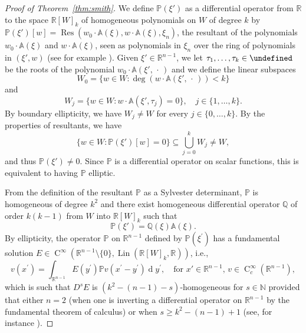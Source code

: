 \documentclass[a4paper,10pt]{amsart}
\let\C\undefined
\newcommand{\R}{\mathbb R}
\newcommand{\N}{\mathbb N}
\newcommand{\Q}{\mathbb Q}
\newcommand{\dif}{\mathrm{d}}
\renewcommand{\dif}{\operatorname{d}\!}
\newcommand{\hold}{\operatorname{C}}
\newcommand{\A}{\mathbb{A}}
\newcommand{\C}{\mathbb{C}}
\newcommand{\Lin}{\operatorname{Lin}}
\numberwithin{equation}{section}
\theoremstyle{remark}
\numberwithin{equation}{section}
\begin{document}
\begin{proof}[Proof of Theorem~\ref{thm:smith}]
		
		We define \(\mathbb{P}(\xi')\) as a differential operator from \(\R\) to the space \(\R[W]_k\) of homogeneous polynomials on \(W\) of degree \(k\) by \(\mathbb{P} (\xi')[w] = \operatorname{Res} (w_0 \cdot \A (\xi),  w \cdot \A (\xi), \xi_n)\), the resultant of the polynomials \(w_0 \cdot \A (\xi)\) and \(w \cdot \A (\xi)\), seen as polynomials in \(\xi_n\) over the ring of polynomials in \((\xi', w)\)  (see for example \cite[Chpt.\ 3,  \S\S 5--6]{CLO}).
		Given \(\xi' \in \R^{n - 1}\), we let
		\(\tau_1, \dotsc, \tau_k \in \C\) be the roots of the polynomial \(w_0 \cdot \A (\xi', \,\cdot\,)\) and we define the linear subspaces
		\begin{equation*}
			W_0 = \{w \in W : \deg (w \cdot \mathbb{A} (\xi', \,\cdot\,)) < k\}
		\end{equation*}
		and 
		\begin{equation*}
			W_j = \{w \in W : w \cdot \mathbb{A}(\xi', \tau_j) = 0\}, \quad  j \in \{1, \dotsc, k\}.
		\end{equation*}
		By boundary ellipticity, we have \(W_j \ne W\) for every \(j \in \{0, \dotsc, k\}\).
		By the properties of resultants, we have 
		\begin{equation*}
			\{ w \in W : \mathbb{P} (\xi')[w]=0\} \subseteq \bigcup_{j = 0}^k W_j \ne W,
		\end{equation*}
		and thus \(\mathbb{P} (\xi') \ne 0\). Since \(\mathbb{P}\) is a differential operator on scalar functions, this is equivalent to having \(\mathbb{P}\) elliptic.
		
		From the definition of the resultant \(\mathbb{P}\) as a Sylvester determinant, \(\mathbb{P}\) is homogeneous of degree \(k^2\) and there exist homogeneous differential operator \(\Q\) of order \(k (k - 1)\) from \(W\) into \(\R[W]_k\) such that
		\[
		\mathbb{P} (\xi') = \mathbb{Q} (\xi) \A (\xi).
		\]
		By ellipticity, the operator $\mathbb{P}$ on $\R^{n-1}$ defined by $\mathbb{P} (\xi^\prime)$ has a fundamental solution $E\in\hold^\infty(\R^{n - 1} \setminus\{0\}, \Lin(\R[W]_k, \R))$, i.e.,
		\begin{equation}
			\label{eq_ood4xaek6pas7eijieGu8soh}
			v(x^\prime)
			=
			\int_{\R^{n-1}}E(y^\prime)\mathbb{P} v(x^\prime-y^\prime)\dif y^\prime,\quad\text{for }x'\in\R^{n-1},\,v\in\hold^\infty_c(\R^{n-1}),
		\end{equation}
		which is such that $D^s E$ is $(k^2  -(n-1)-s)$-homogeneous for \(s \in \N\) provided that either \(n = 2\) (when one is inverting a differential operator on \(\R^{n - 1}\) by the fundamental theorem of calculus) or when $s \ge k^2 - (n - 1) + 1$ (see, for instance \cite[Chpt.~VII]{HormI}).
		

\end{proof}
\end{document}
